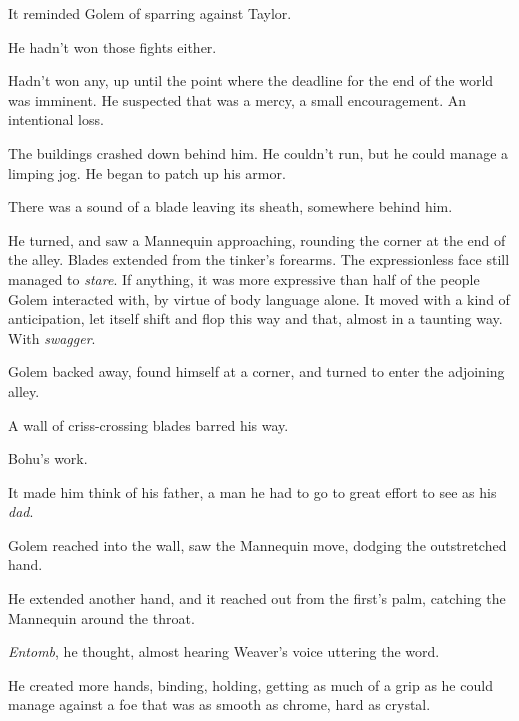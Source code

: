 It reminded Golem of sparring against Taylor.



He hadn't won those fights either.



Hadn't won any, up until the point where the deadline for the end of the world was imminent.  He suspected that was a mercy, a small encouragement.  An intentional loss.



The buildings crashed down behind him.  He couldn't run, but he could manage a limping jog.  He began to patch up his armor.



There was a sound of a blade leaving its sheath, somewhere behind him.



He turned, and saw a Mannequin approaching, rounding the corner at the end of the alley.  Blades extended from the tinker's forearms.  The expressionless face still managed to \emph{stare}.  If anything, it was more expressive than half of the people Golem interacted with, by virtue of body language alone.  It moved with a kind of anticipation, let itself shift and flop this way and that, almost in a taunting way.  With \emph{swagger}.



Golem backed away, found himself at a corner, and turned to enter the adjoining alley.



A wall of criss-crossing blades barred his way.



Bohu's work.



It made him think of his father, a man he had to go to great effort to see as his \emph{dad}.



Golem reached into the wall, saw the Mannequin move, dodging the outstretched hand.



He extended another hand, and it reached out from the first's palm, catching the Mannequin around the throat.



\emph{Entomb}, he thought, almost hearing Weaver's voice uttering the word.



He created more hands, binding, holding, getting as much of a grip as he could manage against a foe that was as smooth as chrome, hard as crystal.



